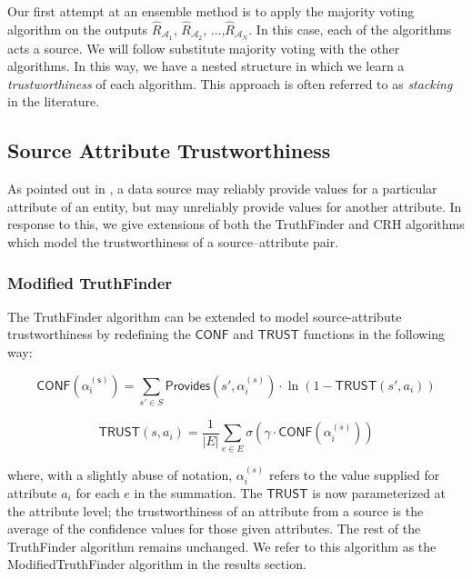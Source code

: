\documentclass{acm_proc_article-sp}
\begin{document}
Our first attempt at an ensemble method is to apply the majority voting algorithm on the outputs $\hat{R}_{\mathcal{A}_1}$, $\hat{R}_{\mathcal{A}_2}$, $\dots$,$\hat{R}_{\mathcal{A}_N}$. In this case, each of the algorithms acts a source. We will follow substitute majority voting with the other algorithms. In this way, we have a nested structure in which we learn a \emph{trustworthiness} of each algorithm. This approach is often referred to as \emph{stacking} in the literature. 

\subsection{Source Attribute Trustworthiness}

As pointed out in \cite{li:truth}, a data source may reliably provide values for a particular attribute of an entity, but may unreliably provide values for another attribute. In response to this, we give extensions of both the {\sc TruthFinder} and {\sc CRH} algorithms which model the trustworthiness of a source--attribute pair. 

\subsubsection{Modified TruthFinder}

 The {\sc TruthFinder} algorithm can be extended to model source-attribute trustworthiness by  redefining the $\mathsf{CONF}$ and $\mathsf{TRUST}$ functions in the following way: 

\begin{equation}
\mathsf{CONF(\alpha_i^{(s)})} = \sum_{s' \in S} \mathsf{Provides}(s',\alpha_i^{(s)}) \cdot \ln(1-\mathsf{TRUST}(s',a_i))
\end{equation}


\begin{equation}
\mathsf{TRUST}(s,a_i) = \frac{1}{|E|} \sum_{e \in E} \sigma(\gamma \cdot \mathsf{CONF}(\alpha_i^{(s)}))
\end{equation}

where, with a slightly abuse of notation, $\alpha_i^{(s)}$ refers to the value supplied for attribute $a_i$ for each $e$ in the summation. The  $\mathsf{TRUST}$ is now parameterized at the attribute level; the trustworthiness of an attribute from a source is the average of the confidence values for those given attributes. The rest of the {\sc TruthFinder} algorithm remains unchanged. We refer to this algorithm as the {\sc ModifiedTruthFinder} algorithm in the results section. 
\end{document}
